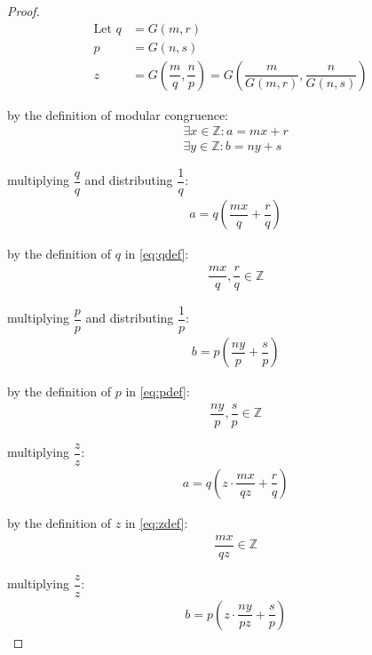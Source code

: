 \documentclass{article}
\begin{document}
\begin{proof}
\begin{align}
  \text{Let }{q} &= G\left({m}, {r}\right) \label{eq:qdef} \\
             {p} &= G\left({n}, {s}\right) \label{eq:pdef} \\
             {z} &= G\left(\dfrac{{m}}{{q}}, \dfrac{{n}}{{p}}\right) =
                    G\left(\dfrac{{m}}{G\left({m}, {r}\right)},
                    \dfrac{{n}}{G\left({n}, {s}\right)}\right) \label{eq:zdef}
\end{align}

by the definition of modular congruence:
\begin{align}
  &\exists {x} \in \mathbb{Z} : {a} = {m}{x} + {r} \\
  &\exists {y} \in \mathbb{Z} : {b} = {n}{y} + {s}
\end{align}

multiplying $\dfrac{{q}}{{q}}$ and distributing $\dfrac{1}{{q}}$:
\begin{align}
  &{a} = {q}\left(\dfrac{{m}{x}}{q} + \dfrac{{r}}{q}\right)
\end{align}

by the definition of ${q}$ in \eqref{eq:qdef}:
\begin{align}
  &\dfrac{{m}{x}}{q}, \dfrac{{r}}{q} \in \mathbb{Z} \label{eq:rqinz}
\end{align}

multiplying $\dfrac{{p}}{{p}}$ and distributing $\dfrac{1}{{p}}$:
\begin{align}
  &{b} = {p}\left(\dfrac{{n}{y}}{{p}} + \dfrac{{s}}{{p}}\right)
\end{align}

by the definition of ${p}$ in \eqref{eq:pdef}:
\begin{align}
  &\dfrac{{n}{y}}{{p}}, \dfrac{{s}}{{p}} \in \mathbb{Z} \label{eq:spinz}
\end{align}

multiplying $\dfrac{{z}}{{z}}$:
\begin{align}
  &{a} = {q}\left({z} \cdot \dfrac{{m}{x}}{{q}{z}} + \dfrac{{r}}{{q}}\right) \label{eq:aeqq}
\end{align}

by the definition of ${z}$ in \eqref{eq:zdef}:
\begin{align}
  &\dfrac{{m}{x}}{{q}{z}} \in \mathbb{Z} \label{eq:mxqzinz}
\end{align}

multiplying $\dfrac{{z}}{{z}}$:
\begin{align}
  &{b} = {p}\left({z} \cdot \dfrac{{n}{y}}{{p}{z}} + \dfrac{{s}}{{p}}\right) \label{eq:beqp}
\end{align}


\end{proof}
\end{document}
